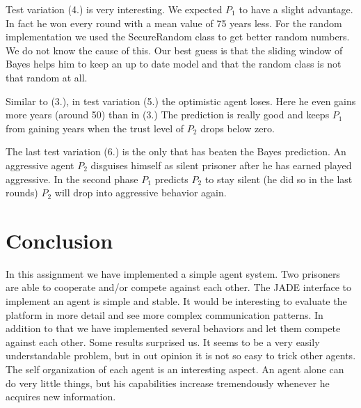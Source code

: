 \documentclass{acm_proc_article-sp}
\begin{document}
Test variation (4.) is very interesting. We expected $P_1$ to have a slight advantage. In fact
he won every round with a mean value of 75 years less. For the
random implementation we used the SecureRandom class to get better random numbers. We
do not know the cause of this. Our best guess is that the sliding window of Bayes helps
him to keep an up to date model and that the random class is not that random at all.

Similar to (3.), in test variation (5.) the optimistic agent loses. 
Here he even gains more years (around 50) than in (3.)
The prediction is really good and keeps $P_1$ from gaining years
when the trust level of $P_2$ drops below zero.

The last test variation (6.) is the only that has beaten the Bayes prediction. An aggressive
agent $P_2$ disguises himself as silent prisoner after he has earned played aggressive.
In the second phase $P_1$ predicts $P_2$ to stay silent (he did so in the last rounds) 
$P_2$ will drop into aggressive behavior again.

\section{Conclusion}

In this assignment we have implemented a simple agent system.  Two prisoners are able to
cooperate and/or compete against each other. The JADE interface to implement an agent
is simple and stable. It would be interesting to evaluate the platform in more detail
and see more complex communication patterns.
In addition to that we have implemented several behaviors and let them compete against each other.
Some results surprised us. It seems to be a very easily understandable problem, but
in out opinion it is not so easy to trick other agents.
The self organization of each agent is an interesting aspect. An agent alone can do
very little things, but his capabilities increase tremendously whenever he acquires new information.



\end{document}
